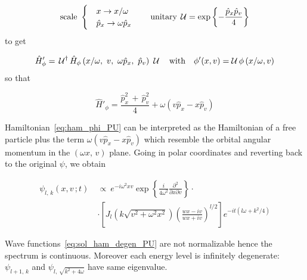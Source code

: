 \begin{equation*}
  \text{scale} \
  \begin{cases}
    &x         \rightarrow x/\omega \\
    &\hat{p}_x \rightarrow \omega\hat{p}_x
  \end{cases}
  \qquad \text{unitary} \;
  \operatorname{\mathcal{U}} = \exp\left\{ - \frac{\hat{p}_x \hat{p}_v}{4}\right\}
\end{equation*}
to get

\begin{equation*}
  \hat{H}'_{\phi} = \, \U^{\dagger}
  \hat{H}_{\phi} \left(x/\omega,\ v,\ \omega \hat{p}_x,\ \hat{p}_v\right) \ \U
  \quad \text{with} \quad
  \phi'(x, v) = \U \phi\left(x/\omega, v\right)
\end{equation*}
so that

\begin{equation} \label{eq:ham_phi_PU}
  \hat{H}'_{\phi} = \frac{\hat{p}^2_x \, + \, \hat{p}^2_{v}}{4}
  + \omega \left(v \hat{p}_x - x \hat{p}_v \right)
\end{equation}

Hamiltonian~\eqref{eq:ham_phi_PU} can be interpreted as the Hamiltonian of a
free particle plus the term $\omega \left(v \hat{p}_x - x \hat{p}_v \right)$
which resemble the orbital angular momentum in the $(\omega x, \, v)$ plane.
Going in polar coordinates and reverting back to the original $\psi$, we obtain

\begin{align} \label{eq:sol_ham_degen_PU}
  \psi_{l, \, k}(x, v \,; t) \ &\propto \
  e^{-i\omega^2xv}
  \exp\left\{
    \frac{i}{4\omega^2} \frac{\partial^2}{\partial x \partial v}
  \right\} \cdot \nonumber \\
  &\cdot \left[
    J_l \left(k\sqrt{v^2 + \omega^2 x^2}\right)
    {\left( \frac{wx - iv}{wx +iv} \right)}^{l/2}
  \right]
  e^{-it (l\omega + k^2/4)}
\end{align}

Wave functions~\eqref{eq:sol_ham_degen_PU} are not normalizable hence the
spectrum is continuous. Moreover each energy level is infinitely degenerate:
$\psi_{l+1, \, k}$ and $\psi_{l, \, \sqrt{k^2 + 4 \omega}}$ have same
eigenvalue.
